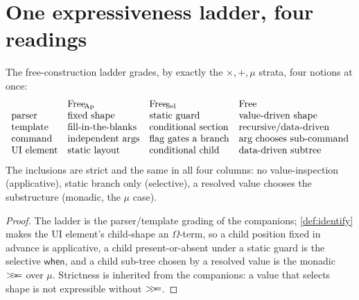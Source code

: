\documentclass[../uxoxo-main]{subfiles}
\begin{document}
\section{One expressiveness ladder, four readings}\label{sec:ladder}
\begin{proposition}\label{prop:ladder}
The free-construction ladder grades, by exactly the $\times,+,\mu$ strata, four
notions at once:
\[
\begin{array}{llll}
 & \mathrm{Free}_{\!\mathrm{Ap}} & \mathrm{Free}_{\!\mathrm{Sel}} & \mathrm{Free}\\
\text{parser} & \text{fixed shape} & \text{static guard} & \text{value-driven shape}\\
\text{template} & \text{fill-in-the-blanks} & \text{conditional section} & \text{recursive/data-driven}\\
\text{command} & \text{independent args} & \text{flag gates a branch} & \text{arg chooses sub-command}\\
\text{UI element} & \text{static layout} & \text{conditional child} & \text{data-driven subtree}
\end{array}
\]
The inclusions are strict and the same in all four columns: no value-inspection
(applicative), static branch only (selective), a resolved value chooses the
substructure (monadic, the $\mu$ case).
\end{proposition}

\begin{proof}
The ladder is the parser/template grading of the companions; \cref{def:identify}
makes the UI element's child-shape an $\Omega$-term, so a child position fixed in
advance is applicative, a child present-or-absent under a static guard is the
selective $\mathsf{when}$, and a child sub-tree chosen by a resolved value is the
monadic $\mathbin{>\!\!>\!\!=}$ over $\mu$. Strictness is inherited from the companions: a value
that selects shape is not expressible without $\mathbin{>\!\!>\!\!=}$.
\end{proof}
\end{document}
